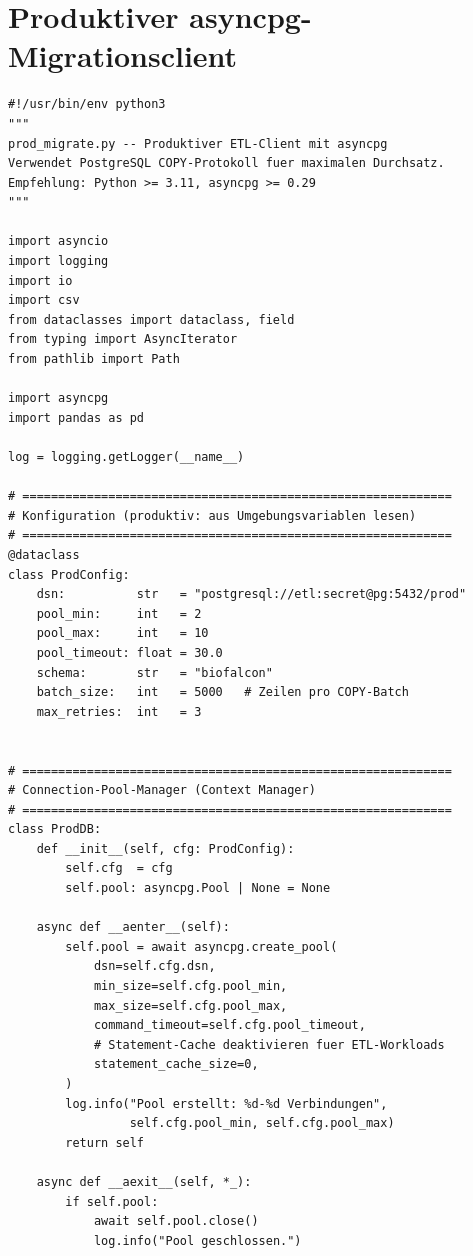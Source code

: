 ﻿\documentclass[12pt,a4paper]{report}
\theoremstyle{definition}
\theoremstyle{remark}
\begin{document}
\section{Produktiver asyncpg-Migrationsclient}

\begin{lstlisting}[style=python, caption={prod\_migrate.py: Asynchroner Produktiv-Client mit Connection Pool}, label=lst:asyncpg]
#!/usr/bin/env python3
"""
prod_migrate.py -- Produktiver ETL-Client mit asyncpg
Verwendet PostgreSQL COPY-Protokoll fuer maximalen Durchsatz.
Empfehlung: Python >= 3.11, asyncpg >= 0.29
"""

import asyncio
import logging
import io
import csv
from dataclasses import dataclass, field
from typing import AsyncIterator
from pathlib import Path

import asyncpg
import pandas as pd

log = logging.getLogger(__name__)

# ============================================================
# Konfiguration (produktiv: aus Umgebungsvariablen lesen)
# ============================================================
@dataclass
class ProdConfig:
    dsn:          str   = "postgresql://etl:secret@pg:5432/prod"
    pool_min:     int   = 2
    pool_max:     int   = 10
    pool_timeout: float = 30.0
    schema:       str   = "biofalcon"
    batch_size:   int   = 5000   # Zeilen pro COPY-Batch
    max_retries:  int   = 3


# ============================================================
# Connection-Pool-Manager (Context Manager)
# ============================================================
class ProdDB:
    def __init__(self, cfg: ProdConfig):
        self.cfg  = cfg
        self.pool: asyncpg.Pool | None = None

    async def __aenter__(self):
        self.pool = await asyncpg.create_pool(
            dsn=self.cfg.dsn,
            min_size=self.cfg.pool_min,
            max_size=self.cfg.pool_max,
            command_timeout=self.cfg.pool_timeout,
            # Statement-Cache deaktivieren fuer ETL-Workloads
            statement_cache_size=0,
        )
        log.info("Pool erstellt: %d-%d Verbindungen",
                 self.cfg.pool_min, self.cfg.pool_max)
        return self

    async def __aexit__(self, *_):
        if self.pool:
            await self.pool.close()
            log.info("Pool geschlossen.")



\end{lstlisting}
\end{document}
